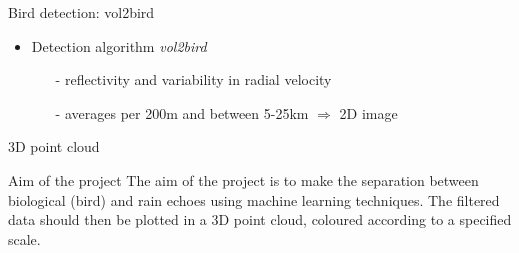\documentclass[usenames,dvipsnames]{beamer}
\begin{document}
\begin{frame}{Bird detection: vol2bird}
\begin{itemize}
	\item Detection algorithm \textit{vol2bird} 
	\begin{itemize}
		\item[-] reflectivity and variability in radial velocity
		\item[-] averages per 200m and between 5-25km $\Rightarrow$ 2D image
	\end{itemize}
\end{itemize}
		\begin{center}
\end{center}
\end{frame}
	
	
\begin{frame}{3D point cloud}
\end{frame}	
	

\begin{frame}{Aim of the project}
The aim of the project is to make the separation between biological (bird) and rain echoes using machine learning techniques. The filtered data should then be plotted in a 3D point cloud, coloured according to a specified scale.
\end{frame}	
	
\end{document}
